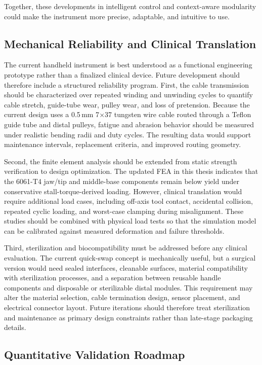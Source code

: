 Together, these developments in intelligent control and context-aware modularity could make the instrument more precise, adaptable, and intuitive to use.

\subsection{Mechanical Reliability and Clinical Translation}

The current handheld instrument is best understood as a functional engineering prototype rather than a finalized clinical device. Future development should therefore include a structured reliability program. First, the cable transmission should be characterized over repeated winding and unwinding cycles to quantify cable stretch, guide-tube wear, pulley wear, and loss of pretension. Because the current design uses a 0.5\,mm 7$\times$37 tungsten wire cable routed through a Teflon guide tube and distal pulleys, fatigue and abrasion behavior should be measured under realistic bending radii and duty cycles. The resulting data would support maintenance intervals, replacement criteria, and improved routing geometry.

Second, the finite element analysis should be extended from static strength verification to design optimization. The updated FEA in this thesis indicates that the 6061-T4 jaw/tip and middle-base components remain below yield under conservative stall-torque-derived loading. However, clinical translation would require additional load cases, including off-axis tool contact, accidental collision, repeated cyclic loading, and worst-case clamping during misalignment. These studies should be combined with physical load tests so that the simulation model can be calibrated against measured deformation and failure thresholds.

Third, sterilization and biocompatibility must be addressed before any clinical evaluation. The current quick-swap concept is mechanically useful, but a surgical version would need sealed interfaces, cleanable surfaces, material compatibility with sterilization processes, and a separation between reusable handle components and disposable or sterilizable distal modules. This requirement may alter the material selection, cable termination design, sensor placement, and electrical connector layout. Future iterations should therefore treat sterilization and maintenance as primary design constraints rather than late-stage packaging details.

\subsection{Quantitative Validation Roadmap}

